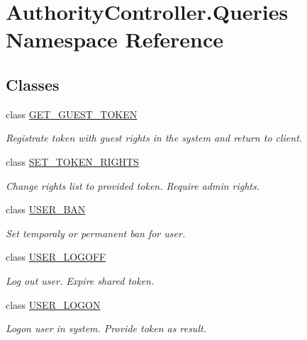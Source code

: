 \hypertarget{namespace_authority_controller_1_1_queries}{}\section{Authority\+Controller.\+Queries Namespace Reference}
\label{namespace_authority_controller_1_1_queries}
\subsection*{Classes}
\begin{DoxyCompactItemize}
\item 
class \mbox{\hyperlink{class_authority_controller_1_1_queries_1_1_g_e_t___g_u_e_s_t___t_o_k_e_n}{G\+E\+T\+\_\+\+G\+U\+E\+S\+T\+\_\+\+T\+O\+K\+EN}}
\begin{DoxyCompactList}\small\item\em Registrate token with guest rights in the system and return to client. \end{DoxyCompactList}\item 
class \mbox{\hyperlink{class_authority_controller_1_1_queries_1_1_s_e_t___t_o_k_e_n___r_i_g_h_t_s}{S\+E\+T\+\_\+\+T\+O\+K\+E\+N\+\_\+\+R\+I\+G\+H\+TS}}
\begin{DoxyCompactList}\small\item\em Change rights list to provided token. Require admin rights. \end{DoxyCompactList}\item 
class \mbox{\hyperlink{class_authority_controller_1_1_queries_1_1_u_s_e_r___b_a_n}{U\+S\+E\+R\+\_\+\+B\+AN}}
\begin{DoxyCompactList}\small\item\em Set temporaly or permanent ban for user. \end{DoxyCompactList}\item 
class \mbox{\hyperlink{class_authority_controller_1_1_queries_1_1_u_s_e_r___l_o_g_o_f_f}{U\+S\+E\+R\+\_\+\+L\+O\+G\+O\+FF}}
\begin{DoxyCompactList}\small\item\em Log out user. Expire shared token. \end{DoxyCompactList}\item 
class \mbox{\hyperlink{class_authority_controller_1_1_queries_1_1_u_s_e_r___l_o_g_o_n}{U\+S\+E\+R\+\_\+\+L\+O\+G\+ON}}
\begin{DoxyCompactList}\small\item\em Logon user in system. Provide token as result. \end{DoxyCompactList}\item 

\end{DoxyCompactItemize}

